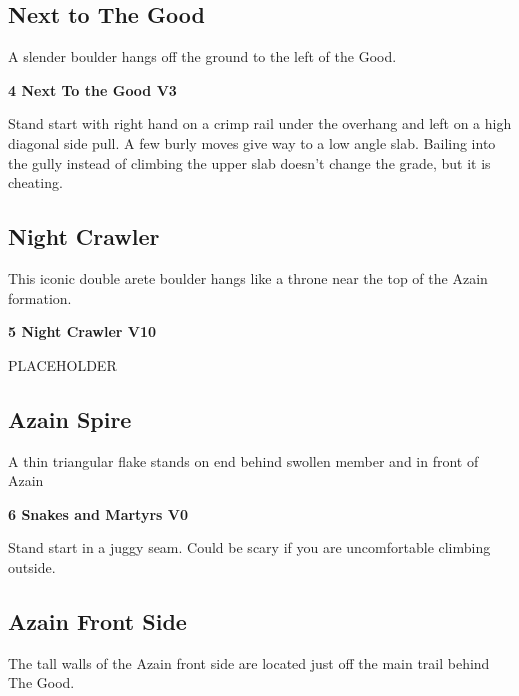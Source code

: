 \begin{multicols*}{2}
			\subsection*{Next to The Good}\label{bf:Next to The Good}
			A slender boulder hangs off the ground to the left of the Good.
			
					\label{rt:Next To the Good} \colorbox{green!20}{\textbf{4 Next To the Good V3   \warn }}
					\begin{adjustwidth}{1cm}{}
					Stand start with right hand on a crimp rail under the overhang and left on a high diagonal side pull. A few burly moves give way to a low angle slab. Bailing into the gully instead of climbing the upper slab doesn't change the grade, but it is cheating.
					\end{adjustwidth}
			\subsection*{Night Crawler}\label{bf:Night Crawler}
			This iconic double arete boulder hangs like a throne near the top of the Azain formation.
			

					\label{rt:Night Crawler} \colorbox{red!20}{\textbf{5 Night Crawler V10  }}
					\begin{adjustwidth}{1cm}{}
					PLACEHOLDER
					\end{adjustwidth}
			\subsection*{Azain Spire}\label{bf:Azain Spire}
			A thin triangular flake stands on end behind swollen member and in front of Azain
			

					\label{rt:Snakes and Martyrs} \colorbox{green!20}{\textbf{6 Snakes and Martyrs V0 \ding{72}    }}
					\begin{adjustwidth}{1cm}{}
					 Stand start in a juggy seam. Could be scary if you are uncomfortable climbing outside.
					\end{adjustwidth}
			\subsection*{Azain Front Side}\label{bf:Azain Front Side}
			The tall walls of the Azain front side are located just off the main trail behind The Good.
			

\end{multicols*}
